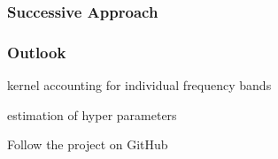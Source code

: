 \documentclass[aspectratio=169, t, 10pt]{beamer}
\begin{document}
\begin{frame}
    \frametitle{Successive Approach}
    \begin{center}
    \end{center}
\end{frame}


\begin{frame}
    \frametitle{Outlook}

    \begin{description}[leftmargin=! ,labelwidth=1cm]
        \item [Succesion order]
        \item [Dispersion]
            kernel accounting for individual frequency bands
        \item [Real data]
            estimation of hyper parameters
    \end{description}

\end{frame}

\begin{frame}
    \hspace{15mm} Follow the project on GitHub \\[1cm]
    \hfill {} \hspace{20mm}
\end{frame}
\end{document}
